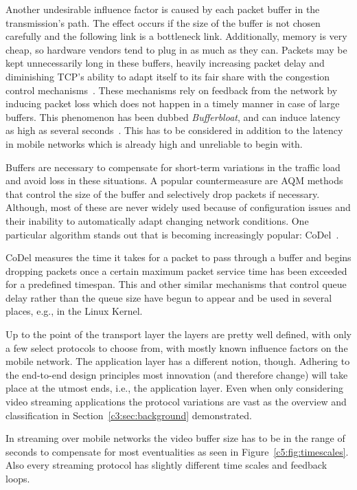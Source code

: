 Another undesirable influence factor is caused by each packet buffer in the transmission's path. The effect occurs if the size of the buffer is not chosen carefully and the following link is a bottleneck link. Additionally, memory is very cheap, so hardware vendors tend to plug in as much as they can. Packets may be kept unnecessarily long in these buffers, heavily increasing packet delay and diminishing \gls{TCP}'s ability to adapt itself to its fair share with the congestion control mechanisms~\cite{jacobson1988congestion,scharf2011comparison}. These mechanisms rely on feedback from the network by inducing packet loss which does not happen in a timely manner in case of large buffers. This phenomenon has been dubbed \textit{Bufferbloat}, and can induce latency as high as several seconds~\cite{gettys2011bufferbloat,groenewegen2011detecting}. This has to be considered in addition to the latency in mobile networks which is already high and unreliable to begin with.

Buffers are necessary to compensate for short-term variations in the traffic load and avoid loss in these situations. A popular countermeasure are \gls{AQM} methods that control the size of the buffer and selectively drop packets if necessary. Although, most of these are never widely used because of configuration issues and their inability to automatically adapt changing network conditions. One particular algorithm stands out that is becoming increasingly popular: CoDel~\cite{Nichols:2012:CQD:2209249.2209264, nichols2014codel}.

CoDel measures the time it takes for a packet to pass through a buffer and begins dropping packets once a certain maximum packet service time has been exceeded for a predefined timespan. This and other similar mechanisms that control queue delay rather than the queue size have begun to appear and be used in several places, e.g., in the Linux Kernel.

Up to the point of the transport layer the layers are pretty well defined, with only a few select protocols to choose from, with mostly known influence factors on the mobile network. The application layer has a different notion, though. Adhering to the end-to-end design principles most innovation (and therefore change) will take place at the utmost ends, i.e., the application layer. Even when only considering video streaming applications the protocol variations are vast as the overview and classification in Section~\ref{c3:sec:background} demonstrated. 

In streaming over mobile networks the video buffer size has to be in the range of seconds to compensate for most eventualities as seen in Figure~\ref{c5:fig:timescales}. Also every streaming protocol has slightly different time scales and feedback loops.

